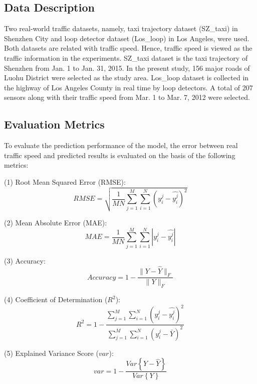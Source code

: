 \documentclass[10pt,journal,compsoc]{IEEEtran}
\begin{document}
\subsection{Data Description}
\par Two real-world traffic datasets, namely, taxi trajectory dataset (SZ\_taxi) in Shenzhen City and loop detector dataset (Los\_loop) in Los Angeles, were used. Both datasets are related with traffic speed. Hence, traffic speed is viewed as the traffic information in the experiments. SZ\_taxi dataset is the taxi trajectory of Shenzhen from Jan. 1 to Jan. 31, 2015. In the present study, 156 major roads of Luohu District were selected as the study area. Los\_loop dataset is collected in the highway of Los Angeles County in real time by loop detectors. A total of 207 sensors along with their traffic speed from Mar. 1 to Mar. 7, 2012 were selected.
\subsection{Evaluation Metrics}
\par To evaluate the prediction performance of the model, the error between real traffic speed and predicted results is evaluated on the basis of the following metrics:
\par (1) Root Mean Squared Error (RMSE):
\begin{equation}
RMSE=\sqrt{\frac{1}{M N}\sum_{j=1}^{M}\sum_{i=1}^{N}(y_{i}^{j}-\widehat{y_{i}^{j}})^{2}}
\end{equation}

\par (2) Mean Absolute Error (MAE):
\begin{equation}
MAE=\frac{1}{M N}\sum_{j=1}^{M}\sum_{i=1}^{N}\left|y_{i}^{j}-\widehat{y_{i}^{j}}\right|
\end{equation}

\par (3) Accuracy:
\begin{equation}
Accuracy=1-\frac{\parallel Y-\widehat{Y}\parallel_{F}}{\parallel Y\parallel_{F}}
\end{equation}

\par (4) Coefficient of Determination ($R^{2}$):
\begin{equation}
R^{2}=1-\frac{\sum_{j=1}^{M}\sum_{i=1}^{N}(y_{i}^{j}-\widehat{y_{i}^{j}})^{2}}{\sum_{j=1}^{M}\sum_{i=1}^{N}(y_{i}^{j}-\bar{Y})^{2}}
\end{equation}

(5) Explained Variance Score ($var$):
\begin{equation}
var=1-\frac{Var\left\{Y-\widehat{Y}\right\}}{Var\left\{Y\right\}}
\end{equation}
\end{document}
